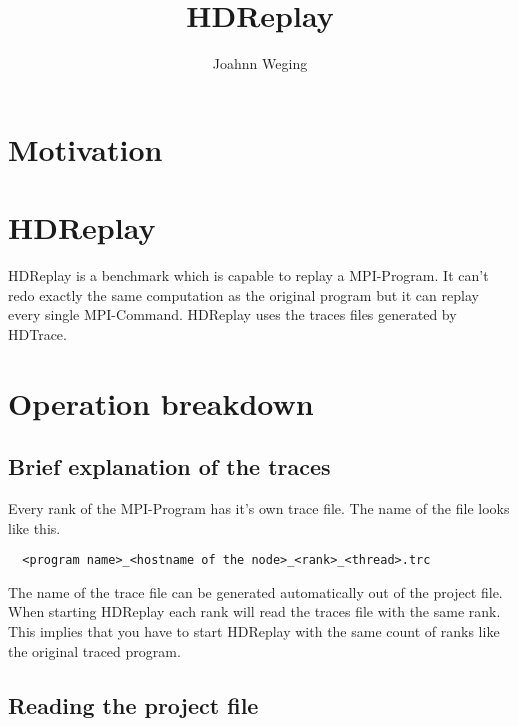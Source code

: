 \documentclass[10pt,a4paper]{scrartcl}
\title{HDReplay}
\author{Joahnn Weging}
\newcommand{\changefont}[3]{
\fontfamily{#1}\fontseries{#2}\fontshape{#3}\selectfont}
\begin{document}
\dosecttoc

\sf
\parindent0mm
\parskip2mm
\begin{small}

	\changefont{cmr}{m}{n}
\maketitle
\newpage
\tableofcontents
\newpage

\section{Motivation}


\section{HDReplay}

HDReplay is a benchmark which is capable to replay a MPI-Program. It can't 
redo exactly the same computation as the original program but it can replay
every single MPI-Command. HDReplay uses the traces files generated by HDTrace.
   
\section{Operation breakdown}

\subsection{Brief explanation of the traces}

Every rank of the MPI-Program has it's own trace file. The name of the file 
looks like this.

\begin{lstlisting}
  <program name>_<hostname of the node>_<rank>_<thread>.trc
\end{lstlisting} 

The name of the trace file can be generated automatically out of the project 
file. When starting HDReplay each rank will read the traces file with the same
rank. This implies that you have to start HDReplay with the same count of ranks
like the original traced program. 

\subsection{Reading the project file}


\end{small}
\end{document}
